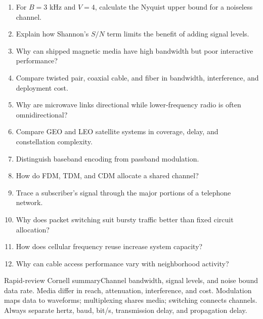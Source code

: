 \documentclass[10pt,letterpaper]{article}
\begin{document}

\begin{enumerate}
  \item For $B=3$ kHz and $V=4$, calculate the Nyquist upper bound for a noiseless channel.
  \item Explain how Shannon's $S/N$ term limits the benefit of adding signal levels.
  \item Why can shipped magnetic media have high bandwidth but poor interactive performance?
  \item Compare twisted pair, coaxial cable, and fiber in bandwidth, interference, and deployment cost.
  \item Why are microwave links directional while lower-frequency radio is often omnidirectional?
  \item Compare GEO and LEO satellite systems in coverage, delay, and constellation complexity.
  \item Distinguish baseband encoding from passband modulation.
  \item How do FDM, TDM, and CDM allocate a shared channel?
  \item Trace a subscriber's signal through the major portions of a telephone network.
  \item Why does packet switching suit bursty traffic better than fixed circuit allocation?
  \item How does cellular frequency reuse increase system capacity?
  \item Why can cable access performance vary with neighborhood activity?
\end{enumerate}
\begin{CornellSummaryBox}{Rapid-review Cornell summary}Channel bandwidth, signal levels, and noise bound data rate. Media differ in reach, attenuation, interference, and cost. Modulation maps data to waveforms; multiplexing shares media; switching connects channels. Always separate hertz, baud, bit/s, transmission delay, and propagation delay.\end{CornellSummaryBox}
\end{document}
